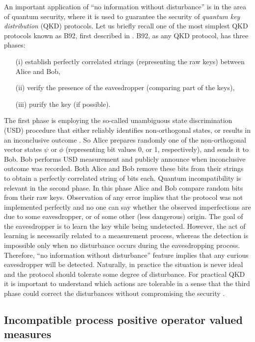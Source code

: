 \documentclass[12pt]{iopart}
\theoremstyle{definition}
\begin{document}
{An important application of ``no information without disturbance'' is in the area of quantum security, where it is used to guarantee the security of \emph{quantum key distribution} (QKD) protocols. 
Let us briefly recall one of the most simplest QKD protocols known as B92, first described in \cite{Bennett92}. 
B92, as any QKD protocol, has three phases: 
\begin{enumerate}
\item[(i)] establish perfectly correlated strings (representing the raw keys) 
between Alice and Bob, 
\item[(ii)] verify the presence of the eavesdropper (comparing part of the keys),
\item[(iii)] purify the key (if possible).
\end{enumerate}
The first phase is employing the
so-called unambiguous state discrimination (USD) procedure that either 
reliably identifies non-orthogonal states, or results in an inconclusive 
outcome \cite{Chefles00}. 
So Alice prepares randomly
one of the non-orthogonal vector states $\psi$ or $\phi$ (representing bit values 
0, or 1, respectively), and sends it to Bob. 
Bob performs USD measurement and publicly announce when inconclusive outcome was recorded. 
Both Alice and Bob remove these bits from their strings to
obtain a perfectly correlated string of bits each. 
Quantum incompatibility is relevant in the second phase. 
In this phase Alice and Bob compare random bits from their raw keys. 
Observation of any error implies that the protocol was not implemented 
perfectly and no one can say whether the observed imperfections are due 
to some eavesdropper, or of some other (less dangerous) origin. The goal
of the eavesdropper is to learn the key while being undetected. However,
the act of learning is necessarily related to a measurement process, whereas
the detection is impossible only when no disturbance occurs during the
eavesdropping process. Therefore, ``no information without disturbance'' 
feature implies that any curious eavesdropper will be detected. 
Naturally, in practice the situation is never ideal and the protocol should tolerate some degree of disturbance. 
For practical QKD it is important to understand which actions are tolerable in a sense that the third phase could correct the disturbances without compromising the security \cite{Renner08}. 



\subsection{Incompatible process positive operator valued measures}
\label{sec:ppovm}

}
\end{document}
